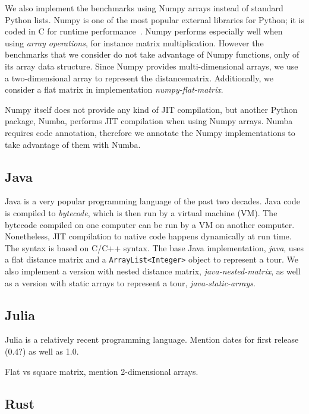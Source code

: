 \documentclass[11pt,a4paper,notitlepage]{article}
\begin{document}
We also implement the benchmarks using Numpy arrays instead
of standard Python lists. Numpy is one of the most popular external
libraries for Python; it is coded in C for runtime
performance~\cite{numpy}. Numpy performs especially well when using
\emph{array operations}, for instance matrix multiplication. However
the benchmarks that we consider do not take advantage of Numpy
functions, only of its array data structure. Since Numpy provides
multi-dimensional arrays, we use a two-dimensional array to represent
the distancematrix. Additionally, we consider a flat matrix in
implementation \emph{numpy-flat-matrix}.

Numpy itself does not provide any kind of JIT compilation, but another
Python package, Numba, performs JIT compilation when using Numpy
arrays. Numba requires code annotation, therefore we annotate the
Numpy implementations to take advantage of them with Numba.

\subsection{Java}
Java is a very popular programming language of the past two
decades. Java code is compiled to \emph{bytecode}, which is then run
by a virtual machine (VM). The bytecode compiled on one computer can
be run by a VM on another computer. Nonetheless, JIT compilation to
native code happens dynamically at run time. The syntax is based on
C/C++ syntax. The base Java implementation, \emph{java}, uses a flat
distance matrix and a \verb|ArrayList<Integer>| object to represent a
tour. We also implement a version with nested distance matrix,
\emph{java-nested-matrix}, as well as a version with static arrays to
represent a tour, \emph{java-static-arrays}.

\subsection{Julia}
Julia is a relatively recent programming language. Mention dates for
first release (0.4?) as well as 1.0.

Flat vs square matrix, mention 2-dimensional arrays.

\subsection{Rust}
\end{document}
